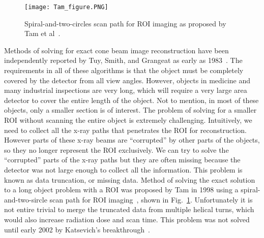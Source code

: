 \begin{figure}[h]
\texttt{[image: Tam\_figure.PNG]}
\caption{Spiral-and-two-circles scan path for ROI imaging as proposed by Tam et al~\citep{Tam1998}.}
\label{fig:tam_circle}
\end{figure}

Methods of solving for exact cone beam image reconstruction have been independently reported by Tuy, Smith, and Grangeat as early as 1983~\citep{Tuy1983, Smith1985, Grangeat1991}.  The requirements in all of these algorithms is that the object must be completely covered by the detector from all view angles.  However, objects in medicine and many industrial inspections are very long, which will require a very large area detector to cover the entire length of the object.  Not to mention, in most of these objects, only a smaller section is of interest.  The problem of solving for a smaller ROI without scanning the entire object is extremely challenging.  Intuitively, we need to collect all the x-ray paths that penetrates the ROI for reconstruction.  However parts of these x-ray beams are ``corrupted'' by other parts of the objects, so they no longer represent the ROI exclusively.  We can try to solve the ``corrupted'' parts of the x-ray paths but they are often missing because the detector was not large enough to collect all the information.  This problem is known as data truncation, or missing data.  Method of solving the exact solution to a long object problem with a ROI was proposed by Tam in 1998 using a spiral-and-two-sircle scan path for ROI imaging~\citep{Tam1998}, shown in Fig.~\ref{fig:tam_circle}.  Unfortunately it is not entire trivial to merge the truncated data from multiple helical turns,  which would also increase radiation dose and scan time.  This problem was not solved until early 2002 by Katsevich's breakthrough~\citep{Katsevich2002SIAM, Katsevich2003, Katsevich2004}.
%

